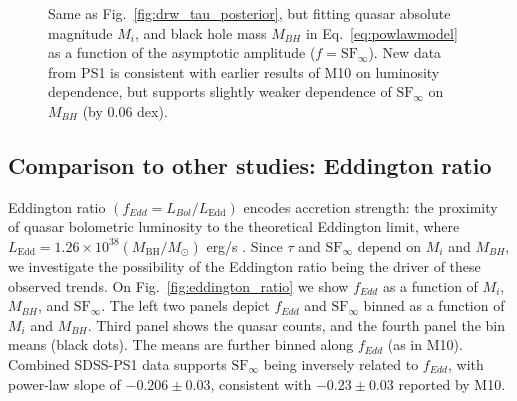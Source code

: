 \documentclass[twocolumn]{aastex62}
\begin{document}
\begin{figure*}
\caption{Same as Fig.~\ref{fig:drw_tau_posterior},  but fitting quasar absolute magnitude $M_{i}$, and black hole mass $M_{BH}$ in Eq.~\ref{eq:powlawmodel} as a function of the asymptotic amplitude ($f = \mathrm{SF}_{\infty}$). New data from PS1 is consistent with earlier results of M10 on luminosity dependence, but supports slightly weaker dependence of $\mathrm{SF}_{\infty}$ on $M_{BH}$ (by 0.06 dex).}
\label{fig:drw_sf_posterior}
\end{figure*} 



\subsection{Comparison to other studies: Eddington ratio}

Eddington ratio $(f_{Edd} {=} L_{Bol}/L_{\mathrm{Edd}})$ encodes accretion strength: the proximity of quasar bolometric luminosity to the theoretical Eddington limit, where $L_{\mathrm{Edd}} {=} 1.26 {\times} 10^{38} (M_{\mathrm{BH}} / M_{\odot})$ erg/s \citep{shen2011}. Since $\tau$ and $\mathrm{SF}_{\infty}$ depend on $M_{i}$ and $M_{BH}$, we investigate the possibility of the Eddington ratio being the driver of these observed trends. On Fig.~\ref{fig:eddington_ratio} we show $f_{Edd} $ as a function of $M_{i}$, $M_{BH}$, and $\mathrm{SF}_{\infty}$. The left two panels depict  $f_{Edd} $ and $\mathrm{SF}_{\infty}$ binned as a function of $M_{i}$ and $M_{BH}$. Third panel shows the quasar counts, and the fourth panel the bin means (black dots). The means are further binned along  $f_{Edd} $ (as in M10). Combined SDSS-PS1 data supports $\mathrm{SF}_{\infty}$  being inversely related to  $f_{Edd} $, with power-law slope of $-0.206 \pm 0.03$, consistent with  $-0.23 \pm 0.03$ reported by M10. 
\end{document}
